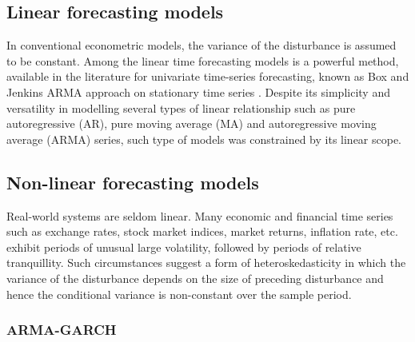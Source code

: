 \subsection{Linear forecasting models}

In conventional econometric models, the variance of the disturbance is assumed to be constant. Among the linear time forecasting models is a powerful method, available in the literature for univariate time-series forecasting, known as Box and Jenkins ARMA approach on stationary time series \cite{B&J}. Despite its simplicity and versatility in modelling several types of linear relationship such as pure autoregressive (AR), pure moving average (MA) and autoregressive moving average (ARMA) series, such type of models was constrained by its linear scope. 

\subsection{Non-linear forecasting models}

Real-world systems are seldom linear. Many economic and financial time series such as exchange rates, stock market indices, market returns, inflation rate, etc. exhibit periods of unusual large volatility, followed by periods of relative tranquillity. Such circumstances suggest a form of heteroskedasticity in which the variance of the disturbance depends on the size of preceding disturbance and hence the conditional variance is non-constant over the sample period. 

\subsubsection{ARMA-GARCH}

